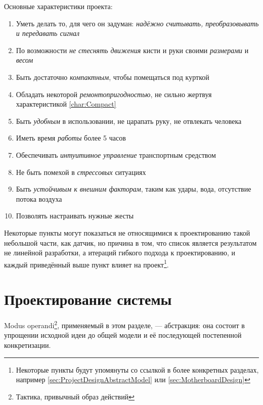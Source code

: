 \documentclass[a4paper, 10pt, final]{article} %
\begin{document}
    \noindent Основные характеристики проекта:
    \begin{enumerate}[label=\emph{(\arabic*)}]
        \item Уметь делать то, для чего он задуман: \emph{надёжно считывать, преобразовывать и передавать сигнал} \label{char:Reliability}
        \item По возможности \emph{не стеснять движения} кисти и руки своими \emph{размерами} и \emph{весом} \label{char:CompactNoDriveImpact}
        \item Быть достаточно \emph{компактным}, чтобы помещаться под курткой \label{char:Compact}
        \item Обладать некоторой \emph{ремонтопригодностью}, не сильно жертвуя характеристикой \ref{char:Compact} \label{char:Repairability}
        \item Быть \emph{удобным} в использовании, не царапать руку, не отвлекать человека \label{char:ComfortableNoPain}
        \item Иметь время \emph{работы} более 5 часов \label{char:Automaticity}
        \item Обеспечивать \emph{интуитивное управление} транспортным средством \label{char:IntuitiveControl}
        \item Не быть помехой в \emph{стрессовых} ситуациях \label{char:StressReactionAdapted}
        \item Быть \emph{устойчивым к внешним факторам}, таким как удары, вода, отсутствие потока воздуха \label{char:ExternalImpactAdapted}
        \item Позволять настраивать нужные жесты \label{char:GestureVariability}
    \end{enumerate}
    Некоторые пункты могут показаться не относящимися к проектированию такой небольшой части, как датчик, но причина в том, что список является результатом не линейной разработки, а итераций гибкого подхода к проектированию, и каждый приведённый выше пункт влияет на проект\footnote{Некоторые пункты будут упомянуты со ссылкой в более конкретных разделах, например \ref{sec:ProjectDesignAbstractModel} или \ref{sec:MotherboardDesign}}. 

    \section{Проектирование системы}\label{sec:ProjectDesign}
    Modus operandi\footnote{Тактика, привычный образ действий}, применяемый в этом разделе, --- абстракция: она состоит в упрощении исходной идеи до общей модели и её последующей постепенной конкретизации.
\end{document}
